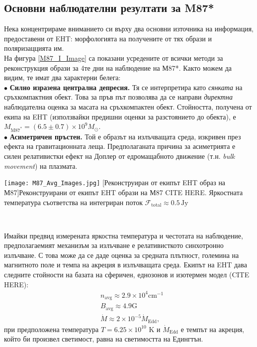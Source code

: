 \subsection{Основни наблюдателни резултати за M87*}

Нека концентрираме вниманието си върху два основни източника на информация, предоставени от EHT: морфологията на получените от тях образи и поляризаццията им. \\

На фигура \ref*{M87_I_Image} са показани усредените от всички методи за реконструкция образи за 4те дни на наблюдение на М87*. Както можем да видим, те имат два характерни белега:\\

$\bullet$ \textbf{Силно изразена централна депресия.} Тя се интерпретира като \emph{сянката} на сръхкомпактния обект. Това за пръв път позволява да се направи \emph{директна} наблюдателна оценка за масата на сръхкомпактен обект. Стойността, получена от екипа на EHT (използвайки предишни оценки за разстоянието до обекта), е $M_{\text{M87}^*} = (6.5\pm 0.7)\times 10^{9} M_\odot$.\\

$\bullet$ \textbf{Асиметричен пръстен.} Той е образът на излъчващата среда, изкривен през ефекта на гравитационната леща. Предполаганата причина за асиметрията е силен релативистки ефект на Доплер от едромащабното движение (т.н. \emph{bulk movement}) на плазмата.\\

\noindent\begin{minipage}{15em}
	\centering
	\texttt{[image: М87\_Avg\_Images.jpg]}
	[Реконструиран от екипът EHT образ на М87]{\small Реконструирани от екипът EHT образи на М87 CITE HERE. Яркостната температура съответства на интегриран поток $\mathcal{F}_{\text{total}}\approx0.5\,\text{Jy}$}
	\label{M87_I_Image}
\end{minipage}\,\,
\begin{minipage}{20em}
	Имайки предвид измерената яркостна температура и честотата на наблюдение, предполагаемият механизъм за излъчване е релативисткото синхотронно излъчване. С това може да се даде оценка за средната плътност, големина на магнитното поле и темпа на акреция в излъчващата среда. Екипът на EHT дава следните стойности на базата на сферичен, еднозонов и изотермен модел (CITE HERE):
	\begin{equation}
		\begin{aligned}
			&n_{\text{avg}} \approx 2.9\times 10^{4} \text{cm}^{-1}\\
			&B_{\text{avg}} \approx 4.9 \text{G}\\
			&\dot{M} \approx 2 \times 10^{-5} \dot{M}_{\text{Edd}},
		\end{aligned}
	\end{equation}
	при предположена температура $T = 6.25\times 10^{10}$ K и $\dot{M}_{\text{Edd}}$ е темпът на акреция, който би произвел светимост, равна на светимостта на Едингтън. 
\end{minipage}\\\newline

